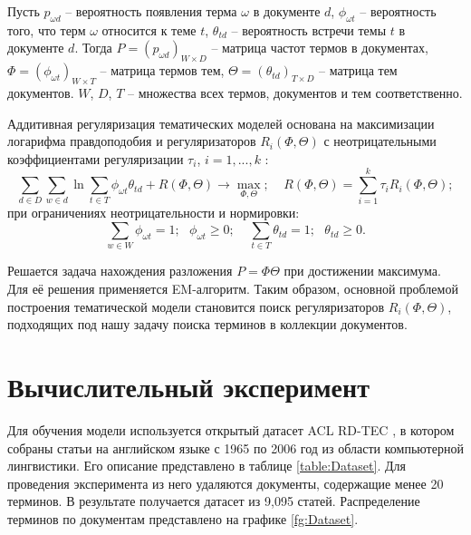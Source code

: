 \documentclass[a4paper, 12pt]{article}
\begin{document}
        Пусть $p_{\omega d}$ -- вероятность появления терма $\omega$ в документе $d$, $\phi_{\omega t}$ -- вероятность того, что терм $\omega$ относится к теме $t$, $\theta_{td}$ -- вероятность встречи темы $t$ в документе $d$. Тогда $P = (p_{\omega d})_{W \times D}$ -- матрица частот термов в документах, $\Phi = (\phi_{\omega t})_{W \times T}$ -- матрица термов тем, $\Theta = (\theta_{td})_{T \times D}$ -- матрица тем документов. $W$, $D$, $T$ -- множества всех термов, документов и тем соответственно.
       
        Аддитивная регуляризация тематических моделей основана на максимизации логарифма правдоподобия и регуляризаторов $R_i(\Phi, \Theta)$ с неотрицательными коэффициентами регуляризации $\tau_i$, $i = 1, ..., k$ \citep{vorontsov2020}:
        \begin{equation}
            \sum\limits_{d \in D}\sum\limits_{w \in d}\ln\sum\limits_{t \in T}\phi_{\omega t}\theta_{td} + R(\Phi, \Theta) \to \max\limits_{\Phi, \Theta}; ~~~~~ R(\Phi, \Theta) = \sum\limits_{i = 1}^k\tau_iR_i(\Phi, \Theta);
        \end{equation}
        при ограничениях неотрицательности и нормировки:
        \begin{equation}
            \sum\limits_{w \in W}\phi_{\omega t} = 1; ~~~ \phi_{\omega t} \geq 0; ~~~~~ \sum\limits_{t \in T}\theta_{td} = 1; ~~~ \theta_{td} \geq 0.
        \end{equation}

    Решается задача нахождения разложения $P = \Phi\Theta$ при достижении максимума. Для её решения применяется EM-алгоритм. Таким образом, основной проблемой построения тематической модели становится поиск регуляризаторов $R_i(\Phi, \Theta)$, подходящих под нашу задачу поиска терминов в коллекции документов.

\section{Вычислительный эксперимент}

    Для обучения модели используется открытый датасет ACL RD-TEC \citep{QZadeh2014}, в котором собраны статьи на английском языке с 1965 по 2006 год из области компьютерной лингвистики. Его описание представлено в таблице \ref{table:Dataset}. Для проведения эксперимента из него удаляются документы, содержащие менее 20 терминов. В результате получается датасет из 9,095 статей. Распределение терминов по документам представлено на графике \ref{fg:Dataset}.
\end{document}
